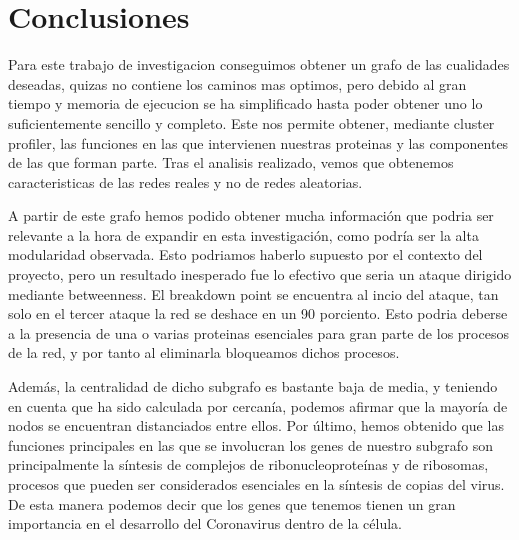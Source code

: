 \section{Conclusiones}
Para este trabajo de investigacion conseguimos obtener un grafo de las cualidades deseadas, quizas no contiene los caminos mas optimos, pero debido al gran tiempo y memoria de ejecucion se ha simplificado hasta poder obtener uno lo suficientemente sencillo y completo. Este nos permite obtener, mediante cluster profiler, las funciones en las que intervienen nuestras proteinas y las componentes de las que forman parte. Tras el analisis realizado, vemos que obtenemos caracteristicas de las redes reales y no de redes aleatorias. \newline

A partir de este grafo hemos podido obtener mucha información que podria ser relevante a la hora de expandir en esta investigación, como podría ser la alta modularidad observada.
Esto podriamos haberlo supuesto por el contexto del proyecto, pero un resultado inesperado fue lo efectivo que seria un ataque dirigido mediante betweenness. El breakdown point se encuentra al incio del ataque, tan solo en el tercer ataque la red se deshace en un 90 porciento. Esto podria deberse a la presencia de una o varias proteinas esenciales para gran parte de los procesos de la red, y por tanto al eliminarla bloqueamos dichos procesos.\newline

Adem\'as, la centralidad de dicho subgrafo es bastante baja de media, y teniendo en cuenta que ha sido calculada por cercan\'ia, podemos afirmar que la mayor\'ia de nodos se encuentran distanciados entre ellos. 
Por \'ultimo, hemos obtenido que las funciones principales en las que se involucran los genes de nuestro subgrafo son principalmente la s\'intesis de complejos de ribonucleoprote\'inas y de ribosomas, procesos que pueden ser considerados esenciales en la s\'intesis de copias del virus. De esta manera podemos decir que los genes que tenemos tienen un gran importancia en el desarrollo del Coronavirus dentro de la c\'elula.

